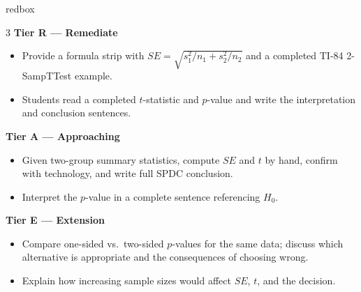 \documentclass[10pt]{article}
\begin{document}
\begin{skillbox}{redbox}
\begin{multicols}{3}
    \textbf{Tier R --- Remediate}
    \begin{itemize}
        \item Provide a formula strip with $SE = \sqrt{s_1^2/n_1 + s_2^2/n_2}$ and a
              completed TI-84 2-SampTTest example.
        \item Students read a completed $t$-statistic and $p$-value and write the
              interpretation and conclusion sentences.
    \end{itemize}
    \columnbreak
    \textbf{Tier A --- Approaching}
    \begin{itemize}
        \item Given two-group summary statistics, compute $SE$ and $t$ by hand,
              confirm with technology, and write full SPDC conclusion.
        \item Interpret the $p$-value in a complete sentence referencing $H_0$.
    \end{itemize}
    \columnbreak
    \textbf{Tier E --- Extension}
    \begin{itemize}
        \item Compare one-sided vs.\ two-sided $p$-values for the same data; discuss
              which alternative is appropriate and the consequences of choosing wrong.
        \item Explain how increasing sample sizes would affect $SE$, $t$, and the
              decision.
    \end{itemize}
\end{multicols}
\end{skillbox}
\end{document}
